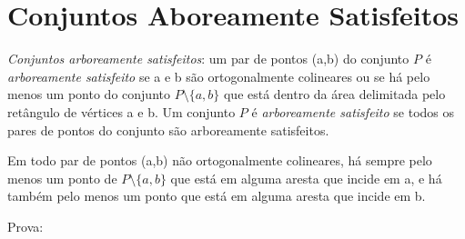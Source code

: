 \section{Conjuntos Aboreamente Satisfeitos}

\textit{Conjuntos arboreamente satisfeitos}: um par de pontos (a,b) do conjunto $P$ é \textit{arboreamente satisfeito} se a e b são ortogonalmente colineares ou se há pelo menos um ponto do conjunto \( P \setminus \{a,b\} \) que está dentro da área delimitada pelo retângulo de vértices a e b. Um conjunto $P$ é \textit{arboreamente satisfeito} se todos os pares de pontos do conjunto são arboreamente satisfeitos.

Em todo par de pontos (a,b) não ortogonalmente colineares, há sempre pelo menos um ponto de \( P \setminus \{a,b\} \) que está em alguma aresta que incide em a, e há também pelo menos um ponto que está em alguma aresta que incide em b.


Prova: 